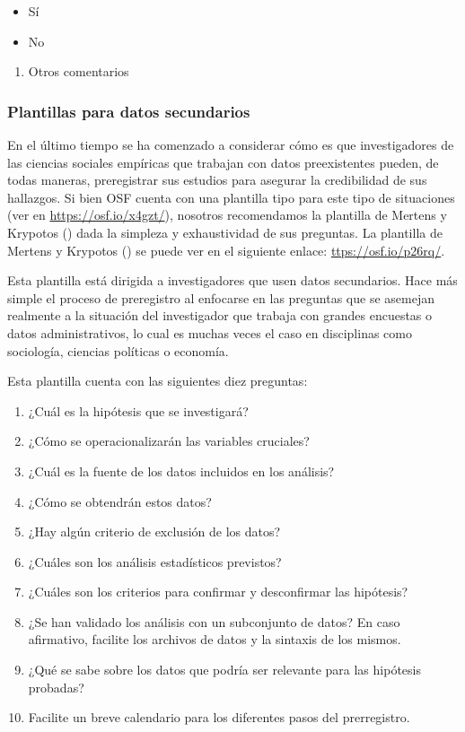 \documentclass[
  spanish,
  a4paper,
  oneside]{scrbook}
\providecommand{\tightlist}{%
  \setlength{\itemsep}{0pt}\setlength{\parskip}{0pt}}
\begin{document}
\begin{itemize}
\tightlist
\item
  Sí
\item
  No
\end{itemize}

\begin{enumerate}
\def\labelenumi{\arabic{enumi}.}
\setcounter{enumi}{2}
\tightlist
\item
  Otros comentarios
\end{enumerate}

\subsubsection{Plantillas para datos
secundarios}\label{plantillas-para-datos-secundarios}

En el último tiempo se ha comenzado a considerar cómo es que
investigadores de las ciencias sociales empíricas que trabajan con datos
preexistentes pueden, de todas maneras, preregistrar sus estudios para
asegurar la credibilidad de sus hallazgos. Si bien OSF cuenta con una
plantilla tipo para este tipo de situaciones (ver en
\url{https://osf.io/x4gzt/}), nosotros recomendamos la plantilla de
Mertens y Krypotos ()
dada la simpleza y exhaustividad de sus preguntas. La plantilla de
Mertens y Krypotos ()
se puede ver en el siguiente enlace:
\href{https://osf.io/p26rq/}{ttps://osf.io/p26rq/}.

Esta plantilla está dirigida a investigadores que usen datos
secundarios. Hace más simple el proceso de preregistro al enfocarse en
las preguntas que se asemejan realmente a la situación del investigador
que trabaja con grandes encuestas o datos administrativos, lo cual es
muchas veces el caso en disciplinas como sociología, ciencias políticas
o economía.

Esta plantilla cuenta con las siguientes diez preguntas:

\begin{enumerate}
\def\labelenumi{\arabic{enumi}.}
\item
  ¿Cuál es la hipótesis que se investigará?
\item
  ¿Cómo se operacionalizarán las variables cruciales?
\item
  ¿Cuál es la fuente de los datos incluidos en los análisis?
\item
  ¿Cómo se obtendrán estos datos?
\item
  ¿Hay algún criterio de exclusión de los datos?
\item
  ¿Cuáles son los análisis estadísticos previstos?
\item
  ¿Cuáles son los criterios para confirmar y desconfirmar las hipótesis?
\item
  ¿Se han validado los análisis con un subconjunto de datos? En caso
  afirmativo, facilite los archivos de datos y la sintaxis de los
  mismos.
\item
  ¿Qué se sabe sobre los datos que podría ser relevante para las
  hipótesis probadas?
\item
  Facilite un breve calendario para los diferentes pasos del
  prerregistro.
\end{enumerate}
\end{document}
